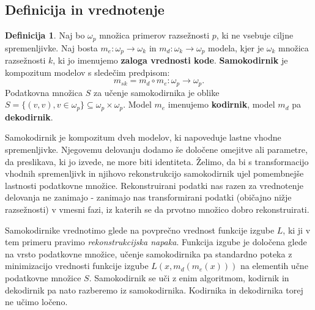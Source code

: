 \documentclass[12pt,a4paper,twoside]{article}
\theoremstyle{definition} %
\newtheorem{definicija}{Definicija}[section]
\theoremstyle{plain} %
\numberwithin{equation}{section}  %
\begin{document}

\subsection{Definicija in vrednotenje}

\begin{definicija}
\label{def-samokodirnik}
Naj bo $\omega_p$ množica primerov razsežnosti $p$, ki ne vsebuje ciljne spremenljivke. Naj bosta $m_e: \omega_p \rightarrow \omega_k$ in $m_d: \omega_k \rightarrow \omega_p$ modela, kjer je $\omega_k$ množica razsežnosti $k$, ki jo imenujemo \textbf{zaloga vrednosti kode}. \textbf{Samokodirnik} je kompozitum modelov s sledečim predpisom:
\[
m_{s k} = m_d \circ m_e : \omega_p \rightarrow \omega_p .
\]
Podatkovna množica $S$ za učenje samokodirnika je oblike $S = \{(v, v), v \in \omega_p\} \subseteq \omega_p \times \omega_p$. Model $m_e$ imenujemo \textbf{kodirnik}, model $m_d$ pa \textbf{dekodirnik}.
\end{definicija}

Samokodirnik je kompozitum dveh modelov, ki napoveduje lastne vhodne spremenljivke. 
Njegovemu delovanju dodamo še določene omejitve ali parametre, da preslikava, ki jo izvede, ne more biti identiteta. 
Želimo, da bi s transformacijo vhodnih spremenljivk in njihovo rekonstrukcijo samokodirnik ujel pomembnejše lastnosti podatkovne množice. 
Rekonstruirani podatki nas razen za vrednotenje delovanja ne zanimajo - zanimajo nas transformirani podatki (običajno nižje razsežnosti) v vmesni fazi, iz katerih se da prvotno množico dobro rekonstruirati.

Samokodirnike vrednotimo glede na povprečno vrednost funkcije izgube $L$, ki ji v tem primeru pravimo \emph{rekonstrukcijska napaka}. 
Funkcija izgube je določena glede na vrsto podatkovne množice, učenje samokodirnika pa standardno poteka z minimizacijo vrednosti funkcije izgube $L(x,m_d(m_e(x)))$ na elementih učne podatkovne množice $S$. 
Samokodirnik se uči z enim algoritmom, kodirnik in dekodirnik pa nato razberemo iz samokodirnika. Kodirnika in dekodirnika torej ne učimo ločeno.
\end{document}
